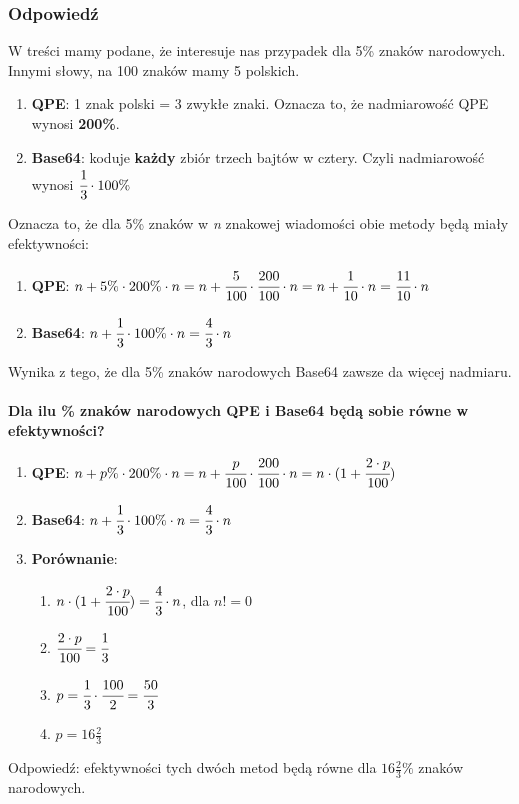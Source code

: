 \documentclass[a4paper,twoside]{article}
\begin{document}
\subsubsection{Odpowiedź}
W treści mamy podane, że interesuje nas przypadek dla 5\% znaków narodowych. Innymi słowy, na 100 znaków mamy 5 polskich.
\begin{enumerate}
	\item \textbf{QPE}: 1 znak polski = 3 zwykłe znaki. Oznacza to, że nadmiarowość QPE wynosi \textbf{200\%}.
	\item \textbf{Base64}: koduje \textbf{każdy} zbiór trzech bajtów w cztery. Czyli nadmiarowość wynosi $ \cfrac{1}{3}\cdot100\% $
\end{enumerate}
Oznacza to, że dla 5\% znaków w \emph{n} znakowej wiadomości obie metody będą miały efektywności:
\begin{enumerate}
	\item \textbf{QPE}: $ n + 5\%\cdot200\%\cdot n=n+\cfrac{5}{100}\cdot\cfrac{200}{100}\cdot n= n+\cfrac{1}{10}\cdot n=\cfrac{11}{10}\cdot n $
	\item \textbf{Base64}: $ n + \cfrac{1}{3}\cdot100\%\cdot n=\cfrac{4}{3}\cdot n $
\end{enumerate}
Wynika z tego, że dla 5\% znaków narodowych Base64 zawsze da więcej nadmiaru.\\\\
\textbf{Dla ilu \% znaków narodowych QPE i Base64 będą sobie równe w efektywności?}
\begin{enumerate}
	\item \textbf{QPE}:
	$ n + p\%\cdot200\%\cdot n = n+\cfrac{p}{100}\cdot\cfrac{200}{100}\cdot n=n\cdot(1+\cfrac{2\cdot p}{100})$
	\item \textbf{Base64}:
	$  n + \cfrac{1}{3}\cdot100\%\cdot n=\cfrac{4}{3}\cdot n $
	\item \textbf{Porównanie}:
	\begin{enumerate}
		\item $ n\cdot(1+\cfrac{2\cdot p}{100})= \cfrac{4}{3}\cdot n $, dla $ n!=0 $
		\item $ \cfrac{2\cdot p}{100}=\cfrac{1}{3} $
		\item $ p=\cfrac{1}{3}\cdot\cfrac{100}{2}=\cfrac{50}{3} $
		\item $ p=16\frac{2}{3} $
	\end{enumerate}
\end{enumerate}
Odpowiedź: efektywności tych dwóch metod będą równe dla $ 16\frac{2}{3}\% $ znaków narodowych.
	
	
\end{document}
